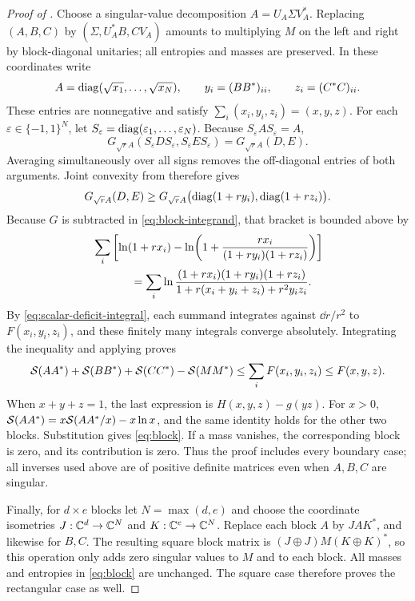 \begin{proof}[Proof of ]
Choose a singular-value decomposition $A=U_A\Sigma V_A^*$.
Replacing $(A,B,C)$ by $(\Sigma,U_A^*B,CV_A)$ amounts to
multiplying $M$ on the left and right by block-diagonal unitaries;
all entropies and masses are preserved. In these coordinates write
\[
 A=\operatorname{diag}(\sqrt{x_1},\ldots,\sqrt{x_N}),\qquad
 y_i=(BB^*)_{ii},\qquad z_i=(C^*C)_{ii}.
\]
These entries are nonnegative and satisfy
$\sum_i(x_i,y_i,z_i)=(x,y,z)$.
For each $\varepsilon\in\{-1,1\}^N$, let
$S_\varepsilon=\operatorname{diag}(\varepsilon_1,\ldots,\varepsilon_N)$.
Because $S_\varepsilon A S_\varepsilon=A$,
\[
 G_{\sqrt r A}(S_\varepsilon DS_\varepsilon,
                S_\varepsilon ES_\varepsilon)
 =G_{\sqrt r A}(D,E).
\]
Averaging simultaneously over all signs removes the off-diagonal
entries of both arguments. Joint convexity from 
therefore gives
\[
 G_{\sqrt r A}(D,E)\ge
 G_{\sqrt r A}\bigl(\operatorname{diag}(1+ry_i),\operatorname{diag}(1+rz_i)\bigr).
\]
Because $G$ is subtracted in \eqref{eq:block-integrand}, that bracket
is bounded above by
\begin{align}
 &\sum_i\left[\ln(1+rx_i)
 -\ln\!\left(1+\frac{rx_i}{(1+ry_i)(1+rz_i)}\right)\right]\notag\\
 &\hspace{12mm}=
 \sum_i\ln\frac{(1+rx_i)(1+ry_i)(1+rz_i)}
                    {1+r(x_i+y_i+z_i)+r^2y_iz_i}.
 \label{eq:block-scalar-integrands}
\end{align}
By \eqref{eq:scalar-deficit-integral}, each summand integrates against
$\dd r/r^2$ to $F(x_i,y_i,z_i)$, and these finitely many integrals
converge absolutely. Integrating
the inequality and applying  proves
\begin{equation}\label{eq:block-unnormalized}
 \mathcal S(AA^*)+\mathcal S(BB^*)+\mathcal S(CC^*)-\mathcal S(MM^*)
 \le\sum_iF(x_i,y_i,z_i)\le F(x,y,z).
\end{equation}
When $x+y+z=1$, the last expression is $H(x,y,z)-g(yz)$.
For $x>0$,
$\mathcal S(AA^*)=x\mathcal S(AA^*/x)-x\ln x$, and the same identity holds
for the other two blocks. Substitution gives \eqref{eq:block}.
If a mass vanishes, the corresponding block is zero, and its
contribution is zero. Thus the proof includes every boundary case;
all inverses used above are of positive definite matrices even
when $A,B,C$ are singular.

Finally, for $d\times e$ blocks let $N=\max(d,e)$ and choose the
coordinate isometries $J:\mathbb C^d\to\mathbb C^N$ and $K:\mathbb C^e\to\mathbb C^N$.
Replace each block $A$ by $JAK^*$, and likewise for $B,C$.
The resulting square block matrix is
$(J\oplus J)M(K\oplus K)^*$, so this operation only adds zero
singular values to $M$ and to each block. All masses and entropies
in \eqref{eq:block} are unchanged. The square case therefore proves
the rectangular case as well.
\end{proof}

